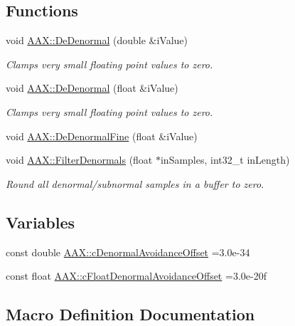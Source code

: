 \subsection*{Functions}
\begin{DoxyCompactItemize}
\item 
void \mbox{\hyperlink{a00852_aaf103dc75b68b6c4f6792dd26f9b4fd0}{A\+A\+X\+::\+De\+Denormal}} (double \&i\+Value)
\begin{DoxyCompactList}\small\item\em Clamps very small floating point values to zero. \end{DoxyCompactList}\item 
void \mbox{\hyperlink{a00852_aedfd1762f559291ceddd53f8ce8862a5}{A\+A\+X\+::\+De\+Denormal}} (float \&i\+Value)
\begin{DoxyCompactList}\small\item\em Clamps very small floating point values to zero. \end{DoxyCompactList}\item 
void \mbox{\hyperlink{a00852_ac52b6214a1de32e59b90ddbc1878e515}{A\+A\+X\+::\+De\+Denormal\+Fine}} (float \&i\+Value)
\item 
void \mbox{\hyperlink{a00852_a73dd9a17abecc28625c4d34279e4534f}{A\+A\+X\+::\+Filter\+Denormals}} (float $\ast$in\+Samples, int32\+\_\+t in\+Length)
\begin{DoxyCompactList}\small\item\em Round all denormal/subnormal samples in a buffer to zero. \end{DoxyCompactList}\end{DoxyCompactItemize}
\subsection*{Variables}
\begin{DoxyCompactItemize}
\item 
const double \mbox{\hyperlink{a00852_a5c2e1bff2891a4b11252759e152cf520}{A\+A\+X\+::c\+Denormal\+Avoidance\+Offset}} =3.\+0e-\/34
\item 
const float \mbox{\hyperlink{a00852_ae3a66eee97cfe006ffbf11f901ddd286}{A\+A\+X\+::c\+Float\+Denormal\+Avoidance\+Offset}} =3.\+0e-\/20f
\end{DoxyCompactItemize}


\subsection{Macro Definition Documentation}
\mbox{\label{a00755_aebb709c3232ca8ebe6ea366ca8391dad}} 
